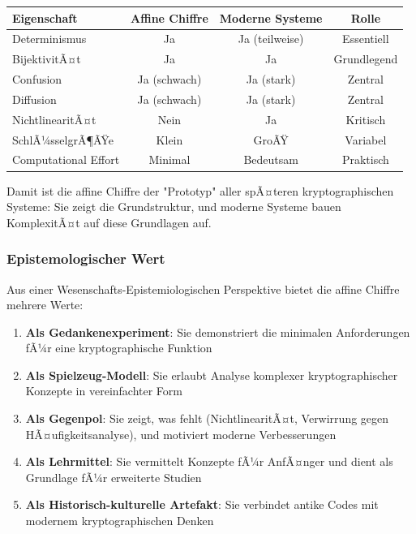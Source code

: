 ﻿\documentclass[12pt,a4paper]{article}
\begin{document}
	\begin{center}
		\begin{tabular}{|l|c|c|c|}
			\hline
			\textbf{Eigenschaft} & \textbf{Affine Chiffre} & \textbf{Moderne Systeme} & \textbf{Rolle} \\
			\hline\hline
			Determinismus & Ja & Ja (teilweise) & Essentiell \\
			BijektivitÃ¤t & Ja & Ja & Grundlegend \\
			Confusion & Ja (schwach) & Ja (stark) & Zentral \\
			Diffusion & Ja (schwach) & Ja (stark) & Zentral \\
			NichtlinearitÃ¤t & Nein & Ja & Kritisch \\
			SchlÃ¼sselgrÃ¶ÃŸe & Klein & GroÃŸ & Variabel \\
			Computational Effort & Minimal & Bedeutsam & Praktisch \\
			\hline
		\end{tabular}
	\end{center}
	
	Damit ist die affine Chiffre der "Prototyp" aller spÃ¤teren kryptographischen Systeme: Sie zeigt die Grundstruktur, und moderne Systeme bauen KomplexitÃ¤t auf diese Grundlagen auf.
	
	\subsubsection{Epistemologischer Wert}
	
	Aus einer Wesenschafts-Epistemiologischen Perspektive bietet die affine Chiffre mehrere Werte:
	
	\begin{enumerate}
		\item \textbf{Als Gedankenexperiment}: Sie demonstriert die minimalen Anforderungen fÃ¼r eine kryptographische Funktion
		\item \textbf{Als Spielzeug-Modell}: Sie erlaubt Analyse komplexer kryptographischer Konzepte in vereinfachter Form
		\item \textbf{Als Gegenpol}: Sie zeigt, was fehlt (NichtlinearitÃ¤t, Verwirrung gegen HÃ¤ufigkeitsana\-lyse), und motiviert moderne Verbesserungen
		\item \textbf{Als Lehrmittel}: Sie vermittelt Konzepte fÃ¼r AnfÃ¤nger und dient als Grundlage fÃ¼r erweiterte Studien
		\item \textbf{Als Historisch-kulturelle Artefakt}: Sie verbindet antike Codes mit modernem kryptographischen Denken
	\end{enumerate}
	
\end{document}
